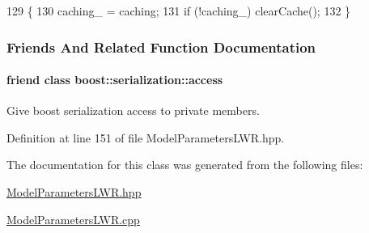 \begin{DoxyCode}
129         \{
130           caching\_ = caching;
131           \textcolor{keywordflow}{if} (!caching\_) clearCache();
132         \}
\end{DoxyCode}


\subsubsection{Friends And Related Function Documentation}
\hypertarget{classDmpBbo_1_1ModelParametersLWR_ac98d07dd8f7b70e16ccb9a01abf56b9c}{
\paragraph[{boost\+::serialization\+::access}]{\setlength{\rightskip}{0pt plus 5cm}friend class boost\+::serialization\+::access\hspace{0.3cm}{\ttfamily [friend]}}}\label{classDmpBbo_1_1ModelParametersLWR_ac98d07dd8f7b70e16ccb9a01abf56b9c}


Give boost serialization access to private members. 



Definition at line 151 of file Model\+Parameters\+L\+W\+R.\+hpp.



The documentation for this class was generated from the following files\+:\begin{DoxyCompactItemize}
\item 
\hyperlink{ModelParametersLWR_8hpp}{Model\+Parameters\+L\+W\+R.\+hpp}\item 
\hyperlink{ModelParametersLWR_8cpp}{Model\+Parameters\+L\+W\+R.\+cpp}\end{DoxyCompactItemize}
